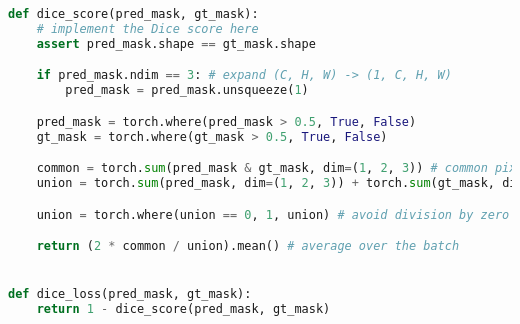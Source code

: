 \begin{lstlisting}[language=Python, caption=utils.py: dice\_loss, label=lst:dice_loss]
def dice_score(pred_mask, gt_mask):
    # implement the Dice score here
    assert pred_mask.shape == gt_mask.shape

    if pred_mask.ndim == 3: # expand (C, H, W) -> (1, C, H, W)
        pred_mask = pred_mask.unsqueeze(1)

    pred_mask = torch.where(pred_mask > 0.5, True, False)
    gt_mask = torch.where(gt_mask > 0.5, True, False)

    common = torch.sum(pred_mask & gt_mask, dim=(1, 2, 3)) # common pixels between pred and gt
    union = torch.sum(pred_mask, dim=(1, 2, 3)) + torch.sum(gt_mask, dim=(1, 2, 3))

    union = torch.where(union == 0, 1, union) # avoid division by zero

    return (2 * common / union).mean() # average over the batch


def dice_loss(pred_mask, gt_mask):
    return 1 - dice_score(pred_mask, gt_mask)
\end{lstlisting}







